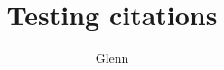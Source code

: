 \documentclass[12pt]{article}
\title{Testing citations}
\author{Glenn}
\begin{document}
\maketitle


%
%

\nocite{*}

\nocite{*}
%
%
\end{document}
